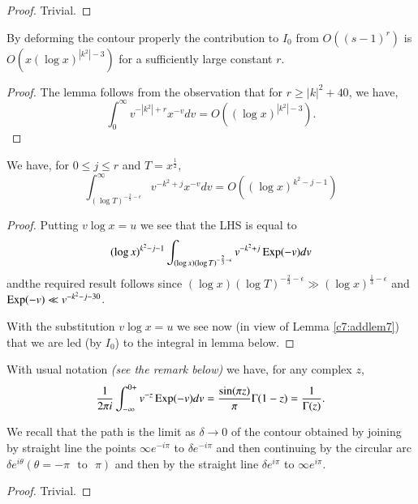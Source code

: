 \begin{proof}
Trivial.
\end{proof}

\begin{lem}\label{c7:addlem6}
By deforming the contour properly the contribution to $I_{0}$ from
$O((s-1)^{r})$ is $O(x(\log x)^{|k^{2}|-3})$ for a sufficiently large
constant $r$.
\end{lem}

\begin{proof}
The lemma follows from the observation that for $r\geq |k|^{2}+40$, we
have,
$$
\int^{\infty}_{0}v^{-|k^{2}|+r}x^{-v}dv=O\left((\log x)^{|k^{2}|-3}\right).
$$
\end{proof}

\begin{lem}\label{c7:addlem7}
We have, for $0\leq j\leq r$ and $T=x^{\frac{1}{2}}$,
$$
\int^{\infty}_{(\log
  T)^{-\frac{2}{3}-\epsilon}}v^{-k^{2}+j}x^{-v}dv=O\left((\log x)^{k^{2}-j-1}\right)
$$
\end{lem}

\begin{proof}
Putting $v\log x=u$ we see that the LHS is equal to
$$
(\log x)^{k^{2}-j-1}\int_{(\log x)(\log
  T)^{-\frac{2}{3}-\epsilon}}v^{-k^{2}+j}\operatorname{Exp}(-v)dv
$$
and\pageoriginale the required result follows since $(\log x)(\log
T)^{-\frac{2}{3}-\epsilon}\gg (\log x)^{\frac{1}{3}-\epsilon}$ and
$\operatorname{Exp}(-v)\ll v^{-k^{2}-j-30}$.

With the substitution $v\log x=u$ we see now (in view of Lemma
\ref{c7:addlem7}) that we are led (by $I_{0}$) to the integral in
lemma below.
\end{proof}

\begin{lem}\label{c7:addlem8}
With usual notation {\em (see the remark below)} we have, for any
complex $z$,
$$
\frac{1}{2\pi i}\int^{0+}_{-\infty}v^{-z}\operatorname{Exp}(-v)dv=\frac{\sin(\pi
  z)}{\pi}\Gamma(1-z)=\frac{1}{\Gamma(z)}. 
$$
\end{lem}

\begin{remark*}
We recall that the path is the limit as $\delta\to 0$ of the contour
obtained by joining by straight line the points $\infty e^{-i\pi}$ to
$\delta e^{-i\pi}$ and then continuing by the circular arc $\delta
e^{i\theta}(\theta=-\pi\text{~ to~ }\pi)$ and then by the straight
line $\delta e^{i\pi}$ to $\infty e^{i\pi}$.
\end{remark*}

\begin{proof}
Trivial.
\end{proof}

